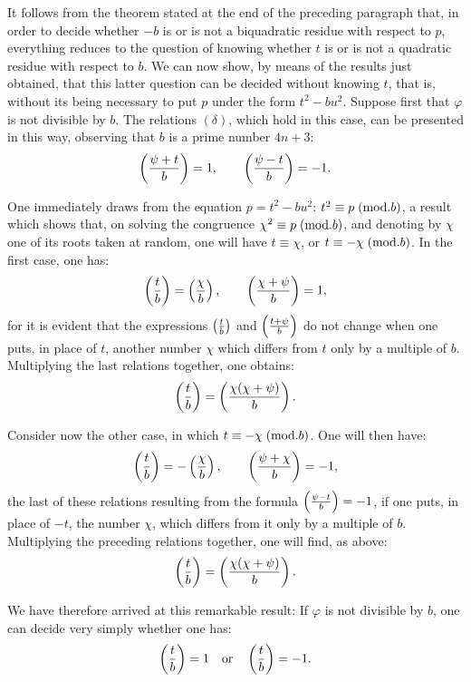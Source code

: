 \par\noindent
It follows from the theorem stated at the end of the preceding paragraph that, in order to decide
whether $-b$ is or is not a biquadratic residue with respect to $p$, everything reduces to the
question of knowing whether $t$ is or is not a quadratic residue with respect to $b$. We can now
show, by means of the results just obtained, that this latter question can be decided without
knowing $t$, that is, without its being necessary to put $p$ under the form $t^2-bu^2$. Suppose
first that $\varphi$ is not divisible by $b$. The relations $(\delta)$, which hold in this case,
can be presented in this way, observing that $b$ is a prime number $4n+3$:
\[
\left(\frac{\psi+t}{b}\right)=1,\qquad \left(\frac{\psi-t}{b}\right)=-1.
\]
\par\noindent
One immediately draws from the equation $p=t^2-bu^2$: $t^2\equiv p\;(\mathrm{mod}.b)$, a result which shows
that, on solving the congruence $\chi^2\equiv p\;(\mathrm{mod}.b)$, and denoting by $\chi$ one of its roots
taken at random, one will have $t\equiv\chi$, or $t\equiv-\chi\;(\mathrm{mod}.b)$. In the first case, one has:
\[
\left(\frac{t}{b}\right)=\left(\frac{\chi}{b}\right),\qquad \left(\frac{\chi+\psi}{b}\right)=1,
\]
for it is evident that the expressions $\left(\frac{t}{b}\right)$ and $\left(\frac{t+\psi}{b}\right)$ do not change when one
puts, in place of $t$, another number $\chi$ which differs from $t$ only by a multiple of $b$.
Multiplying the last relations together, one obtains:
\[
\left(\frac{t}{b}\right)=\left(\frac{\chi(\chi+\psi)}{b}\right).
\]
\par\noindent
Consider now the other case, in which $t\equiv-\chi\;(\mathrm{mod}.b)$. One will then have:
\[
\left(\frac{t}{b}\right)=-\left(\frac{\chi}{b}\right),\qquad \left(\frac{\psi+\chi}{b}\right)=-1,
\]
the last of these relations resulting from the formula $\left(\frac{\psi-t}{b}\right)=-1$, if one puts, in place
of $-t$, the number $\chi$, which differs from it only by a multiple of $b$. Multiplying the
preceding relations together, one will find, as above:
\[
\left(\frac{t}{b}\right)=\left(\frac{\chi(\chi+\psi)}{b}\right).
\]
\par\noindent
We have therefore arrived at this remarkable result: If $\varphi$ is not divisible by $b$, one can
decide very simply whether one has:
\[
\left(\frac{t}{b}\right)=1\quad\hbox{or}\quad \left(\frac{t}{b}\right)=-1.
\]
